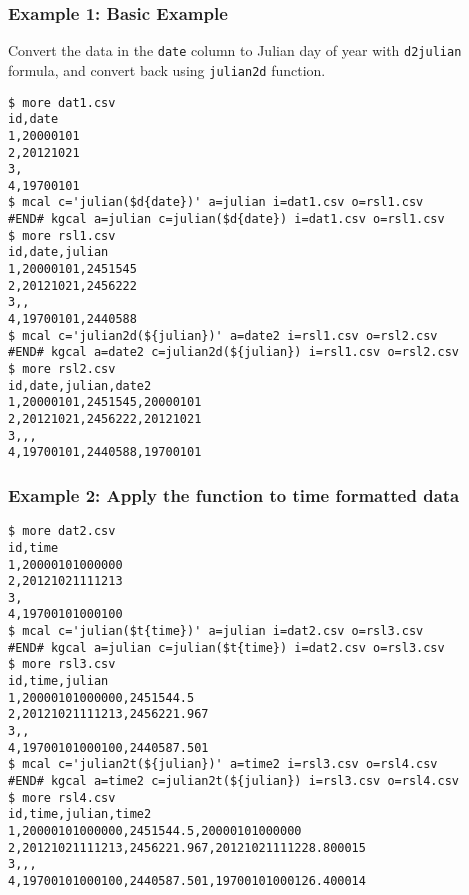 \subsubsection*{Example 1: Basic Example}

Convert the data in the \verb|date| column to Julian day of year with \verb|d2julian| formula, and convert back using \verb|julian2d| function.


\begin{Verbatim}[baselinestretch=0.7,frame=single]
$ more dat1.csv
id,date
1,20000101
2,20121021
3,
4,19700101
$ mcal c='julian($d{date})' a=julian i=dat1.csv o=rsl1.csv
#END# kgcal a=julian c=julian($d{date}) i=dat1.csv o=rsl1.csv
$ more rsl1.csv
id,date,julian
1,20000101,2451545
2,20121021,2456222
3,,
4,19700101,2440588
$ mcal c='julian2d(${julian})' a=date2 i=rsl1.csv o=rsl2.csv
#END# kgcal a=date2 c=julian2d(${julian}) i=rsl1.csv o=rsl2.csv
$ more rsl2.csv
id,date,julian,date2
1,20000101,2451545,20000101
2,20121021,2456222,20121021
3,,,
4,19700101,2440588,19700101
\end{Verbatim}
\subsubsection*{Example 2: Apply the function to time formatted data}



\begin{Verbatim}[baselinestretch=0.7,frame=single]
$ more dat2.csv
id,time
1,20000101000000
2,20121021111213
3,
4,19700101000100
$ mcal c='julian($t{time})' a=julian i=dat2.csv o=rsl3.csv
#END# kgcal a=julian c=julian($t{time}) i=dat2.csv o=rsl3.csv
$ more rsl3.csv
id,time,julian
1,20000101000000,2451544.5
2,20121021111213,2456221.967
3,,
4,19700101000100,2440587.501
$ mcal c='julian2t(${julian})' a=time2 i=rsl3.csv o=rsl4.csv
#END# kgcal a=time2 c=julian2t(${julian}) i=rsl3.csv o=rsl4.csv
$ more rsl4.csv
id,time,julian,time2
1,20000101000000,2451544.5,20000101000000
2,20121021111213,2456221.967,20121021111228.800015
3,,,
4,19700101000100,2440587.501,19700101000126.400014
\end{Verbatim}
